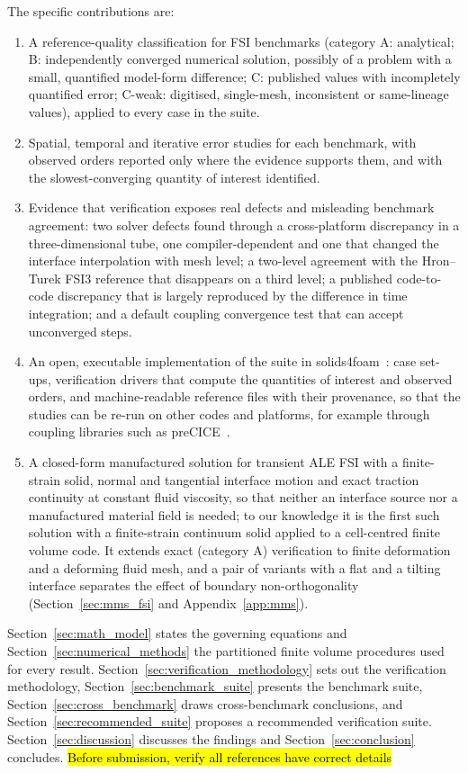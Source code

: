 The specific contributions are:
\begin{enumerate}
    \item A reference-quality classification for FSI benchmarks (category A: analytical; B: independently converged numerical solution, possibly of a problem with a small, quantified model-form difference; C: published values with incompletely quantified error; C-weak: digitised, single-mesh, inconsistent or same-lineage values), applied to every case in the suite.
    \item Spatial, temporal and iterative error studies for each benchmark, with observed orders reported only where the evidence supports them, and with the slowest-converging quantity of interest identified.
    \item Evidence that verification exposes real defects and misleading benchmark agreement: two solver defects found through a cross-platform discrepancy in a three-dimensional tube, one compiler-dependent and one that changed the interface interpolation with mesh level; a two-level agreement with the Hron--Turek FSI3 reference that disappears on a third level; a published code-to-code discrepancy that is largely reproduced by the difference in time integration; and a default coupling convergence test that can accept unconverged steps.
    \item An open, executable implementation of the suite in solids4foam~\citep{Cardiff2025}: case set-ups, verification drivers that compute the quantities of interest and observed orders, and machine-readable reference files with their provenance, so that the studies can be re-run on other codes and platforms, for example through coupling libraries such as preCICE~\citep{Chourdakis2022}.
    \item A closed-form manufactured solution for transient ALE FSI with a finite-strain solid, normal and tangential interface motion and exact traction continuity at constant fluid viscosity, so that neither an interface source nor a manufactured material field is needed; to our knowledge it is the first such solution with a finite-strain continuum solid applied to a cell-centred finite volume code. It extends exact (category A) verification to finite deformation and a deforming fluid mesh, and a pair of variants with a flat and a tilting interface separates the effect of boundary non-orthogonality (Section~\ref{sec:mms_fsi} and Appendix~\ref{app:mms}).
\end{enumerate}

Section~\ref{sec:math_model} states the governing equations and Section~\ref{sec:numerical_methods} the partitioned finite volume procedures used for every result.
Section~\ref{sec:verification_methodology} sets out the verification methodology, Section~\ref{sec:benchmark_suite} presents the benchmark suite, Section~\ref{sec:cross_benchmark} draws cross-benchmark conclusions, and Section~\ref{sec:recommended_suite} proposes a recommended verification suite.
Section~\ref{sec:discussion} discusses the findings and Section~\ref{sec:conclusion} concludes.
\hl{Before submission, verify all references have correct details}
